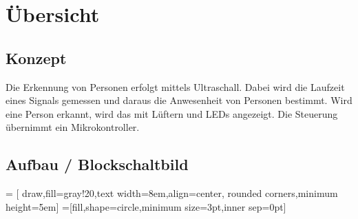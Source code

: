 



\section{Übersicht}

\subsection{Konzept}
Die Erkennung von Personen erfolgt mittels Ultraschall. Dabei wird die Laufzeit 
eines Signals gemessen und daraus die Anwesenheit von Personen bestimmt. Wird 
eine Person erkannt, wird das mit Lüftern und LEDs angezeigt. Die Steuerung 
übernimmt ein Mikrokontroller. 

\subsection{Aufbau / Blockschaltbild}
\begin{center}
 = [ draw,fill=gray!20,text width=8em,align=center,
                      rounded corners,minimum height=5em]
\def\radius{.7mm}
=[fill,shape=circle,minimum size=3pt,inner sep=0pt]
\end{center}
